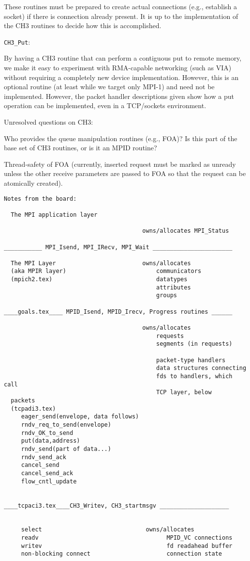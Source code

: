 \documentclass{article}
\def\code#1{\texttt{#1}}
\begin{document}
These routines must be prepared to create actual connections (e.g., establish
a socket) if there is connection already present.  It is up to the
implementation of the CH3 routines to decide how this is accomplished.

\code{CH3_Put}:

By having a CH3 routine that can perform a contiguous put to remote memory, we
make it easy to experiment with RMA-capable networking (such as VIA) without
requiring a completely new device implementation.  However, this is an
optional routine (at least while we target only MPI-1) and need not be
implemented.  However, the packet handler descriptions given show how a put
operation can be implemented, even in a TCP/sockets environment.

Unresolved questions on CH3:

Who provides the queue manipulation routines (e.g., FOA)?  Is this part of the
base set of CH3 routines, or is it an MPID routine?  

Thread-safety of FOA (currently, inserted request must be marked as unready
unless the other receive parameters are passed to FOA so that the request can
be atomically created).


\begin{verbatim}
Notes from the board:

  The MPI application layer

                                        owns/allocates MPI_Status

___________ MPI_Isend, MPI_IRecv, MPI_Wait _______________________

  The MPI Layer                         owns/allocates
  (aka MPIR layer)                          communicators
  (mpich2.tex)                              datatypes
                                            attributes
                                            groups

____goals.tex____ MPID_Isend, MPID_Irecv, Progress routines ______

                                        owns/allocates
                                            requests
                                            segments (in requests)

                                            packet-type handlers
                                            data structures connecting
                                            fds to handlers, which call
                                            TCP layer, below 
  packets
  (tcpadi3.tex)
     eager_send(envelope, data follows)
     rndv_req_to_send(envelope)
     rndv_OK_to_send
     put(data,address)
     rndv_send(part of data...)
     rndv_send_ack
     cancel_send
     cancel_send_ack
     flow_cntl_update


____tcpaci3.tex____CH3_Writev, CH3_startmsgv ____________________


     select                              owns/allocates
     readv                                     MPID_VC connections
     writev                                    fd readahead buffer
     non-blocking connect                      connection state

\end{verbatim}
\end{document}
